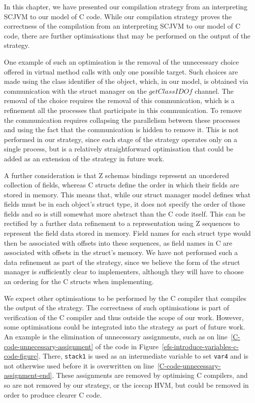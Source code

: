In this chapter, we have presented our compilation strategy from an
interpreting SCJVM to our model of C code.
While our compilation strategy proves the correctness of the
compilation from an interpreting SCJVM to our model of C code, there
are further optimisations that may be performed on the output of the
strategy.

One example of such an optimisation is the removal of the unnecessary
choice offered in virtual method calls with only one possible target.
Such choices are made using the class identifier of the object, which,
in our model, is obtained via communication with the struct manager on
the $getClassIDOf$ channel.
The removal of the choice requires the removal of this communication,
which is a refinement all the processes that participate in this
communication.
To remove the communication requires collapsing the parallelism
between these processes and using the fact that the communication is
hidden to remove it.
This is not performed in our strategy, since each stage of the
strategy operates only on a single process, but is a relatively
straightforward optimisation that could be added as an extension of the
strategy in future work.

A further consideration is that Z schemas bindings represent an
unordered collection of fields, whereas C structs define the order in
which their fields are stored in memory.
This means that, while our struct manager model defines what fields
must be in each object's struct type, it does not specify the order of
those fields and so is still somewhat more abstract than the C code
itself.
This can be rectified by a further data refinement to a representation
using Z sequences to represent the field data stored in memory.
Field names for each struct type would then be associated with offsets
into these sequences, as field names in C are associated with offsets
in the struct's memory.
We have not performed such a data refinement as part of the strategy,
since we believe the form of the struct manager is sufficiently clear
to implementers, although they will have to choose an ordering for the
C structs when implementing.

We expect other optimisations to be performed by the C compiler that
compiles the output of the strategy.
The correctness of such optimisations is part of verification of the C
compiler and thus outside the scope of our work.
However, some optimisations could be integrated into the strategy as
part of future work.
An example is the elimination of unnecessary assignments, such as on
line~\ref{C-code-unnecessary-assignment} of the code in
Figure~\ref{efs-introduce-variables-c-code-figure}.
There, \texttt{stack1} is used as an intermediate variable to set
\texttt{var4} and is not otherwise used before it is overwritten on
line~\ref{C-code-unnecessary-assignment-end}.
These assignments are removed by optimising C compilers, and so are
not removed by our strategy, or the icecap HVM, but could be removed
in order to produce clearer C code.


